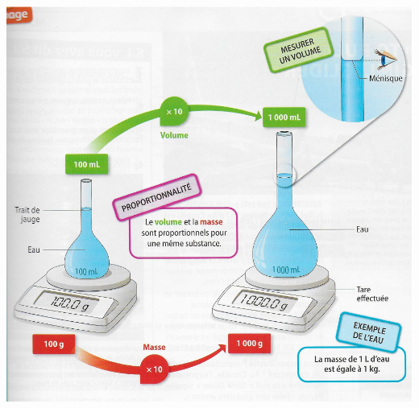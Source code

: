 \documentclass[xcolor={dvipsnames}]{beamer}
\begin{document}
\begin{frame}
\begin{center}
	\includegraphics[scale=0.5]{bilan}
\end{center}

\end{frame}
%
%	
%
%
%	
\end{document}
